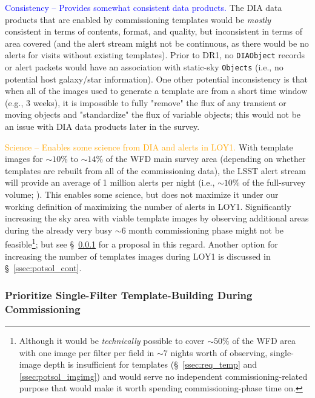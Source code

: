 \documentclass[DM,lsstdraft,toc]{lsstdoc}
\begin{document}
\textcolor{blue}{ Consistency -- Provides somewhat consistent data products.} The DIA data products that are enabled by commissioning templates would be {\em mostly} consistent in terms of contents, format, and quality, but inconsistent in terms of area covered (and the alert stream might not be continuous, as there would be no alerts for visits without existing templates). Prior to DR1, no {\tt DIAObject} records or alert packets would have an association with static-sky {\tt Objects} (i.e., no potential host galaxy/star information). One other potential inconsistency is that when all of the images used to generate a template are from a short time window (e.g., 3 weeks), it is impossible to fully "remove" the flux of any transient or moving objects and "standardize" the flux of variable objects; this would not be an issue with DIA data products later in the survey.

\textcolor{orange}{ Science -- Enables some science from DIA and alerts in LOY1.} With template images for $\sim10\%$ to $\sim14\%$ of the WFD main survey area (depending on whether templates are rebuilt from all of the commissioning data), the LSST alert stream will provide an average of 1 million alerts per night (i.e., $\sim10\%$ of the full-survey volume; ). This enables some science, but does not maximize it under our working definition of maximizing the number of alerts in LOY1. Significantly increasing the sky area with viable template images by observing additional areas during the already very busy $\sim$6 month commissioning phase might not be feasible\footnote{Although it would be {\it technically} possible to cover $\sim50\%$ of the WFD area with one image per filter per field in $\sim7$ nights worth of observing, single-image depth is insufficient for templates (\S~\ref{ssec:req_temp} and \ref{ssec:potsol_imgimg}) and would serve no independent commissioning-related purpose that would make it worth spending commissioning-phase time on.}; but see \S~\ref{sssec:potsol_comm_r} for a proposal in this regard. Another option for increasing the number of templates images during LOY1 is discussed in \S~\ref{ssec:potsol_cont}.


\clearpage
\subsubsection{Prioritize Single-Filter Template-Building During Commissioning}\label{sssec:potsol_comm_r}
\end{document}
